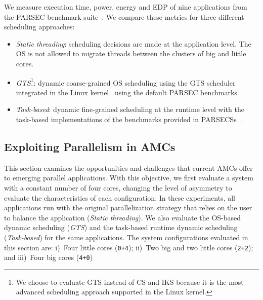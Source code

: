 We measure execution time, power, energy and EDP of nine 
applications from the PARSEC benchmark suite~\cite{Bienia:PhD2011}. We compare these metrics for 
three different scheduling approaches:
\begin{itemize}
\item \textit{Static threading}: scheduling decisions are made at the application level. The OS is not allowed to migrate threads between the clusters of big and little cores. 
\item \textit{GTS}\footnote{We choose to evaluate GTS instead of CS and IKS because it is the most advanced scheduling approach supported in the Linux kernel.}: dynamic coarse-grained OS scheduling 
using the GTS scheduler integrated in the Linux kernel~\cite{samsung, ARM} using the default 
PARSEC benchmarks. 
\item \textit{Task-based}: dynamic fine-grained scheduling at the runtime level with the task-based implementations of the benchmarks provided in PARSECSs~\cite{Chasapis:TACO2016}.
\end{itemize}


\subsection{Exploiting Parallelism in AMCs}
\label{sec:eval:A}


This section examines the opportunities and challenges that current AMCs offer to emerging parallel applications. With this objective, we first evaluate a system with a constant number of four cores, changing the level of asymmetry to evaluate the characteristics of each configuration. In these experiments, all applications run with the original parallelization strategy that relies on the user to balance the application (\emph{Static threading}). We also evaluate the OS-based dynamic scheduling (\emph{GTS}) and the task-based runtime dynamic scheduling (\emph{Task-based}) for the same applications. 
The system configurations evaluated in this section are:
i)~Four little cores (\texttt{0+4}); ii)~Two big and two little cores (\texttt{2+2}); and iii)~Four 
big cores (\texttt{4+0})


